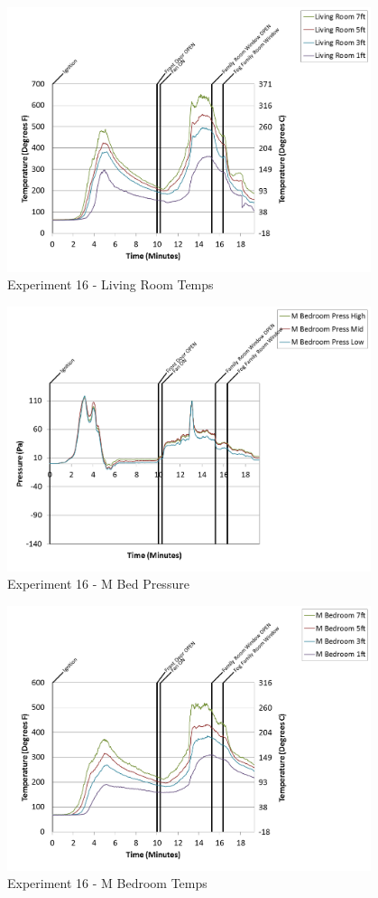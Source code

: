 \documentclass{article}
\begin{document}
\begin{appendices}
\clearpage

\begin{figure}[h!]
	\centering
	\includegraphics[height=3.05in]{0_Images/Results_Charts/Exp_16_Charts/LivingRoomTemps.png}
	\caption{Experiment 16 - Living Room Temps}
\end{figure}


\begin{figure}[h!]
	\centering
	\includegraphics[height=3.05in]{0_Images/Results_Charts/Exp_16_Charts/MBedPressure.png}
	\caption{Experiment 16 - M Bed Pressure}
\end{figure}

\clearpage

\begin{figure}[h!]
	\centering
	\includegraphics[height=3.05in]{0_Images/Results_Charts/Exp_16_Charts/MBedroomTemps.png}
	\caption{Experiment 16 - M Bedroom Temps}
\end{figure}



\end{appendices}
\end{document}
